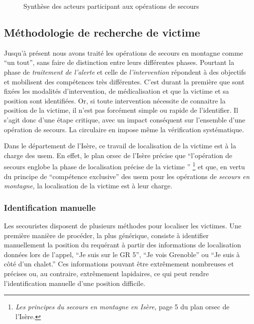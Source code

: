\begin{figure}
  \centering
  
  \caption{Synthèse des acteurs participant aux opérations de secours}
  \label{fig:org_sec}
\end{figure}



\subsection{Méthodologie de recherche de victime}
\label{susec:1-1-2}

Jusqu'à présent nous avons traité les opérations de secours en
montagne comme \enquote{un tout}, sans faire de distinction entre
leurs différentes phases.
%
Pourtant la phase de \emph{traitement de l'alerte} et celle de
\emph{l'intervention} répondent à des objectifs et mobilisent des
compétences très différentes. C'est durant la première que sont fixées
les modalités d'intervention, de médicalisation et que la victime et
sa position sont identifiées. Or, si toute intervention nécessite de
connaitre la position de la victime, il n'est pas forcément simple ou
rapide de l'identifier. Il s'agit donc d'une étape critique, avec un
impact conséquent sur l'ensemble d'une opération de secours. La
circulaire  en impose même la vérification systématique.

Dans le département de l'Isère, ce travail de localisation de la
victime est à la charge des \ac{usem}. En effet, le plan \ac{orsec} de
l'Isère précise que \enquote{l’opération de secours \textelp{} englobe
  la phase de localisation précise de la victime \textelp{}}
\footnote{\emph{Les principes du secours en montagne en Isère,} page 5
  du plan \ac{orsec} de l'Isère.} et que, en vertu du principe de
\enquote{compétence exclusive} des \ac{usem} pour les opérations de
\emph{secours en montagne,} la localisation de la victime est à leur
charge.


\subsubsection{Identification manuelle}
\label{subsec:1-1-2-1}

Les secouristes disposent de plusieurs méthodes pour localiser les
victimes. Une première manière de procéder, la plus générique,
consiste à identifier manuellement la position du requérant à partir
des informations de localisation données lors de l'appel, \eg
\enquote{Je suis sur le GR 5}, \enquote{Je vois Grenoble} ou
\enquote{Je suis à côté d'un chalet.} Ces informations pouvant être
extrêmement nombreuses et précises ou, au contraire, extrêmement
lapidaires, ce qui peut rendre l'identification manuelle d'une
position difficile.

